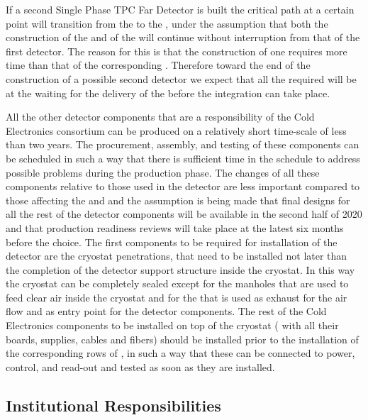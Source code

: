 If a second Single Phase TPC Far Detector is built the critical
path at a certain point will transition from the 
to the , under the assumption that both the construction
of the  and of the  will continue 
without interruption from that of the first detector. The reason
for this is that the construction of one  requires 
more time than that of the corresponding . Therefore
toward the end of the construction of a possible second detector
we expect that all the required  will be at the
 waiting for the delivery of the  before
the integration can take place.

All the other detector components that are a responsibility of the
Cold Electronics consortium can be produced on a relatively short
time-scale of less than two years. The procurement, assembly, and
testing of these components can be scheduled in such a way that
there is sufficient time in the schedule to address possible 
problems during the production phase. The changes of all these
components relative to those used in the  detector
are less important compared to those affecting the 
and  and the assumption is being made that final
designs for all the rest of the detector components will be 
available in the second half of 2020 and that production readiness
reviews will take place at the latest six months before the
 choice. The first components to be
required for installation of the detector are the cryostat 
penetrations, that need to be installed not later than the 
completion of the detector support structure inside the cryostat.
In this way the cryostat can be completely sealed except for
the manholes that are used to feed clear air inside the cryostat
and for the  that is used as exhaust for the air flow
and as entry point for the detector components. The rest of the
Cold Electronics components to be installed on top of the 
cryostat ( with all their boards, supplies, cables
and fibers) should be installed prior to the installation of
the corresponding rows of , in such a way that these
can be connected to power, control, and read-out and tested as
soon as they are installed. 

\subsection{Institutional Responsibilities}
\label{sec:fdsp-tpcelec-management-resp}

